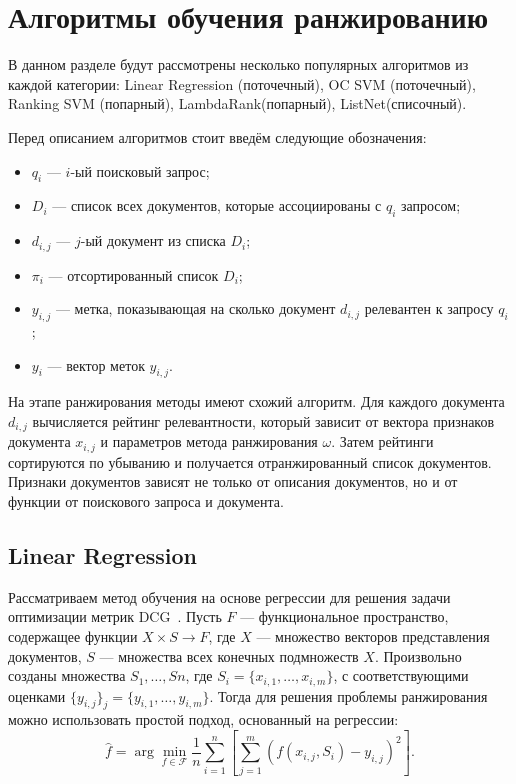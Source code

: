 \section{Алгоритмы обучения ранжированию}

В данном разделе будут рассмотрены несколько популярных алгоритмов из каждой категории: Linear Regression (поточечный), OC SVM (поточечный), Ranking SVM (попарный), LambdaRank(попарный), ListNet(списочный). 

Перед описанием алгоритмов стоит введём следующие обозначения:
\begin{itemize}[label=---]
	\item $q_{i}$ --- $i$-ый поисковый запрос;
	\item $D_{i}$ --- список всех документов, которые ассоциированы с $q_{i}$ запросом;
	\item $d_{i,j}$ --- $j$-ый документ из списка $D_{i}$;
	\item $\pi_{i}$ --- отсортированный список $D_{i}$;
	\item $y_{i,j}$ --- метка, показывающая на сколько документ $d_{i,j}$ релевантен к запросу $q_{i}$;
	\item $y_{i}$ --- вектор меток $y_{i,j}$.
\end{itemize}

На этапе ранжирования методы имеют схожий алгоритм. Для каждого документа $d_{i,j}$ вычисляется рейтинг релевантности, который зависит от вектора признаков документа $x_{i,j}$ и параметров метода ранжирования $\omega$. Затем рейтинги сортируются по убыванию и получается отранжированный список документов. Признаки документов зависят не только от описания документов, но и от функции от поискового запроса и
документа.

\subsection{Linear Regression}

Рассматриваем метод обучения на основе регрессии для решения задачи оптимизации метрик DCG~\cite{LR}. Пусть $F$ --- функциональное пространство, содержащее функции $X \times S \to F$, где $X$ --- множество векторов представления документов, $S$ --- множества всех конечных подмножеств $X$. Произвольно созданы множества $S_{1}, \dots, S{n}$, где $S_{i} = \{x_{i,1}, \dots, x_{i,m}\}$, с соответствующими оценками $\{y_{i,j}\}_{j} = \{y_{i,1}, \dots, y_{i,m}\}$. Тогда для решения проблемы ранжирования можно использовать простой подход, основанный на регрессии:
\[
\hat{f}=\arg \min _{f \in \mathcal{F}} \frac{1}{n} \sum_{i=1}^n[\sum_{j=1}^m(f(x_{i, j}, S_i)-y_{i, j})^2] .
\]

